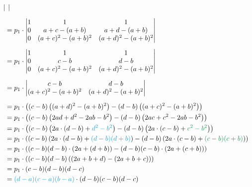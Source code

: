 \documentclass[main.tex]{subfiles}
\begin{document}
\begin{align*}
\begin{vmatrix}
    \end{vmatrix} \\[2mm]
    &= p_1 \cdot 
        \begin{vmatrix}
            1 &               1 & 1 \\
            0 &       a+c-(a+b) & a+d-(a+b) \\
            0 & (a+c)^2-(a+b)^2 & (a+d)^2-(a+b)^2 \\
        \end{vmatrix} \\[2mm]
    &= p_1 \cdot 
        \begin{vmatrix}
            1 &               1 & 1 \\
            0 &             c-b & d-b \\
            0 & (a+c)^2-(a+b)^2 & (a+d)^2-(a+b)^2 \\
        \end{vmatrix} \\[2mm]
    &= p_1 \cdot 
        \begin{vmatrix}
                        c-b & d-b \\
            (a+c)^2-(a+b)^2 & (a+d)^2-(a+b)^2 \\
        \end{vmatrix} \\[2mm]
    &= p_1 \cdot 
    \left( (c-b)\left((a+d)^2-(a+b)^2\right) - (d-b)\left((a+c)^2-(a+b)^2\right) \right)\\
    &= p_1 \cdot 
    \left( (c-b)\left(
        2ad +d^2  -2ab -b^2
    \right) - (d-b)\left(
        2ac +c^2  -2ab -b^2
    \right) \right)\\
    &= p_1 \cdot 
    \left( (c-b)\left(
        2a\cdot (d-b) + \textcolor{Cerulean}{d^2 - b^2}
    \right) - (d-b)\left(
        2a \cdot(c-b) + \textcolor{ForestGreen}{c^2 - b^2}
    \right) \right)\\
    &= %
    p_1 \cdot 
    \left( (c-b)\left(
        2a\cdot (d-b) + \textcolor{Cerulean}{(d-b)(d+b)}
    \right) - (d-b)\left(
        2a \cdot(c-b) + \textcolor{ForestGreen}{(c-b)(c+b)}
    \right) \right)\\
    &= %
    p_1 \cdot 
    \left( (c-b)
        (d-b) \cdot (2a + (d+b))
    - (d-b)
        (c-b) \cdot (2a + (c+b))
    \right)\\
    &= %
    p_1 \cdot 
    \left( (c-b)(d-b) \left(
         (2a+b+d) - (2a+b+c)
    \right) \right)\\
    &= %
    p_1 \cdot (c-b)(d-b)(d - c) \\
    &= \textcolor{Cerulean}{(d-a)(c-a)(b-a)} \cdot (d-b)(c-b)(d-c)
\end{align*}
\end{document}
